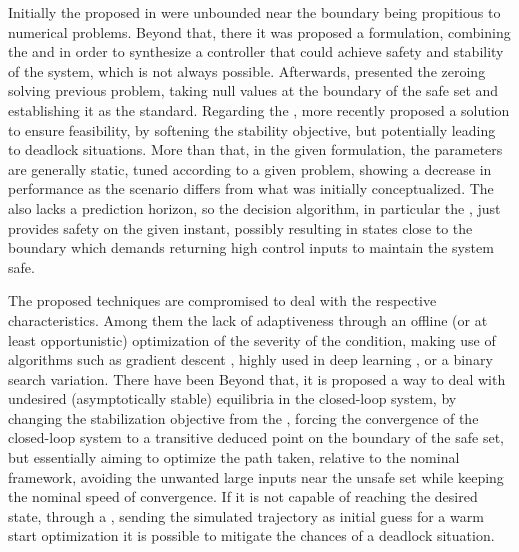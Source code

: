 Initially the  proposed in \cite{ames2014control} were unbounded near the boundary being propitious to numerical problems. Beyond that, there it was proposed a  formulation, combining the  and  in order to synthesize a controller that could achieve safety and stability of the system, which is not always possible.  Afterwards, \cite{xu2015robustness} presented the zeroing  solving previous problem, taking null values at the boundary of the safe set and establishing it as the standard. Regarding the , more recently \cite{ames2019control} proposed a solution to ensure feasibility, by softening the stability objective, but potentially leading to deadlock situations. More than that, in the given formulation, the  parameters are generally static, tuned according to a given problem, showing a decrease in performance as the scenario differs from what was initially conceptualized. The  also lacks a prediction horizon, so the decision algorithm, in particular the , just provides safety on the given instant, possibly resulting in states close to the boundary which demands returning high control inputs to maintain the system safe.

The proposed techniques are compromised to deal with the respective characteristics. Among them the lack of adaptiveness through an offline (or at least opportunistic) optimization of the severity of the  condition, making use of algorithms  such as gradient descent \cite{ruder2016overview}, highly used in deep learning \cite{tian2023recent}, or a binary search \cite{lin2019binary} variation. There have been  Beyond that, it is proposed a way to deal with undesired (asymptotically stable) equilibria in the closed-loop system, by changing the stabilization objective from the , forcing the convergence of the closed-loop system to a transitive deduced point on the boundary of the safe set, but essentially aiming to optimize the path taken, relative to the nominal  framework, avoiding the unwanted large inputs near the unsafe set while keeping the nominal speed of convergence. If it is not capable of reaching the desired state, through a , sending the simulated trajectory as initial guess for a warm start optimization it is possible to mitigate the chances of a deadlock situation. 


